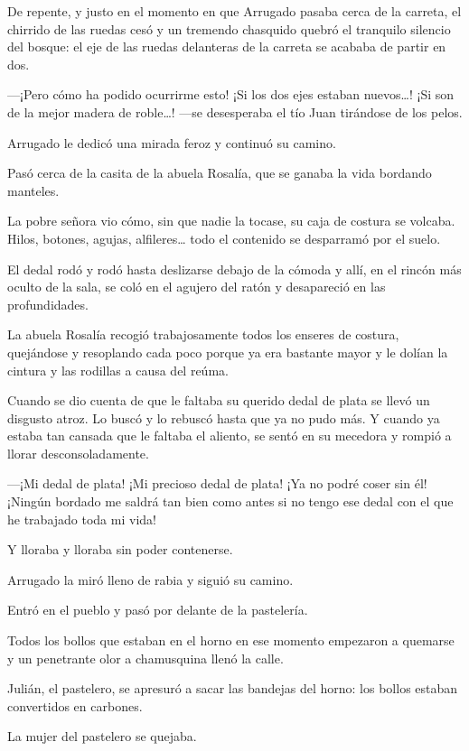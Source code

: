\documentclass{barcodevapor3pags}
\begin{document}
De repente, y justo en el momento en que Arrugado pasaba cerca de la
carreta, el chirrido de las ruedas cesó y un tremendo chasquido quebró
el tranquilo silencio del bosque: el eje de las ruedas delanteras de la
carreta se acababa de partir en dos.

---¡Pero cómo ha podido ocurrirme esto! ¡Si los dos ejes estaban
nuevos\ldots! ¡Si son de la mejor madera de roble\ldots! ---se
desesperaba el tío Juan tirándose de los pelos.

Arrugado le dedicó una mirada feroz y continuó su camino.

Pasó cerca de la casita de la abuela Rosalía, que se ganaba la vida
bordando manteles.

La pobre señora vio cómo, sin que nadie la tocase, su caja de costura se
volcaba. Hilos, botones, agujas, alfileres\ldots{} todo el contenido se
desparramó por el suelo.

El dedal rodó y rodó hasta deslizarse debajo de la cómoda y allí, en el
rincón más oculto de la sala, se coló en el agujero del ratón y
desapareció en las profundidades.

La abuela Rosalía recogió trabajosamente todos los enseres de costura,
quejándose y resoplando cada poco porque ya era bastante mayor y le
dolían la cintura y las rodillas a causa del reúma.

Cuando se dio cuenta de que le faltaba su querido dedal de plata se
llevó un disgusto atroz. Lo buscó y lo rebuscó hasta que ya no pudo más.
Y cuando ya estaba tan cansada que le faltaba el aliento, se sentó en su
mecedora y rompió a llorar desconsoladamente.

---¡Mi dedal de plata! ¡Mi precioso dedal de plata! ¡Ya no podré coser
sin él! ¡Ningún bordado me saldrá tan bien como antes si no tengo ese
dedal con el que he trabajado toda mi vida!

Y lloraba y lloraba sin poder contenerse.

Arrugado la miró lleno de rabia y siguió su camino.

Entró en el pueblo y pasó por delante de la pastelería.

Todos los bollos que estaban en el horno en ese momento empezaron a
quemarse y un penetrante olor a chamusquina llenó la calle.


Julián, el pastelero, se apresuró a sacar las bandejas del horno: los
bollos estaban convertidos en carbones.

La mujer del pastelero se quejaba.
\end{document}
